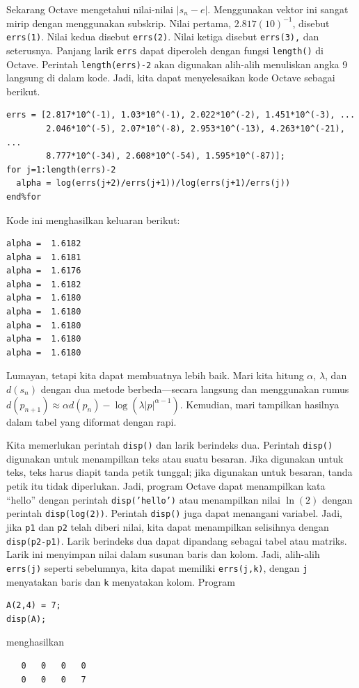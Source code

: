 Sekarang Octave mengetahui nilai-nilai $|s_{n}-e|$. Menggunakan vektor
ini sangat mirip dengan menggunakan subskrip. Nilai pertama, $2.817(10)^{-1}$,
disebut \texttt{errs(1)}. Nilai kedua disebut \texttt{errs(2)}. Nilai
ketiga disebut \texttt{errs(3),} dan seterusnya. Panjang larik \texttt{errs}
dapat diperoleh dengan fungsi \texttt{length()} 
di Octave. Perintah \texttt{length(errs)-2} akan digunakan alih-alih
menuliskan angka 9 langsung di dalam kode. Jadi, kita dapat menyelesaikan
kode Octave sebagai berikut. \begin{verbatim}
errs = [2.817*10^(-1), 1.03*10^(-1), 2.022*10^(-2), 1.451*10^(-3), ...
        2.046*10^(-5), 2.07*10^(-8), 2.953*10^(-13), 4.263*10^(-21), ...
        8.777*10^(-34), 2.608*10^(-54), 1.595*10^(-87)];
for j=1:length(errs)-2
  alpha = log(errs(j+2)/errs(j+1))/log(errs(j+1)/errs(j))
end%for
\end{verbatim}

\noindent Kode ini menghasilkan keluaran berikut: \begin{verbatim}
alpha =  1.6182
alpha =  1.6181
alpha =  1.6176
alpha =  1.6182
alpha =  1.6180
alpha =  1.6180
alpha =  1.6180
alpha =  1.6180
alpha =  1.6180
\end{verbatim}Lumayan, tetapi kita dapat membuatnya lebih baik. Mari kita hitung
$\alpha$, $\lambda$, dan $d(s_{n})$ dengan dua metode berbeda---secara
langsung dan menggunakan rumus $d(p_{n+1})\approx\alpha d(p_{n})-\log\left(\lambda|p|^{\alpha-1}\right)$.
Kemudian, mari tampilkan hasilnya dalam tabel yang diformat dengan
rapi. 

Kita memerlukan perintah \texttt{disp()} dan larik berindeks dua.
Perintah \texttt{disp()}  digunakan
untuk menampilkan teks atau suatu besaran. Jika digunakan untuk teks,
teks harus diapit tanda petik tunggal; jika digunakan untuk besaran,
tanda petik itu tidak diperlukan. Jadi, program Octave dapat menampilkan
kata ``hello'' dengan perintah \texttt{disp('hello')} atau menampilkan
nilai $\ln(2)$ dengan perintah \texttt{disp(log(2))}. Perintah \texttt{disp()}
juga dapat menangani variabel. Jadi, jika \texttt{p1} dan \texttt{p2}
telah diberi nilai, kita dapat menampilkan selisihnya dengan \texttt{disp(p2-p1)}.
Larik berindeks dua dapat dipandang sebagai tabel atau matriks. Larik
ini menyimpan nilai dalam susunan baris dan kolom. Jadi, alih-alih
\texttt{errs(j)} seperti sebelumnya, kita dapat memiliki \texttt{errs(j,k)},
dengan \texttt{j} menyatakan baris dan \texttt{k} menyatakan kolom.
Program \begin{verbatim}
A(2,4) = 7;
disp(A);
\end{verbatim}menghasilkan \begin{verbatim}
   0   0   0   0
   0   0   0   7 
\end{verbatim}

